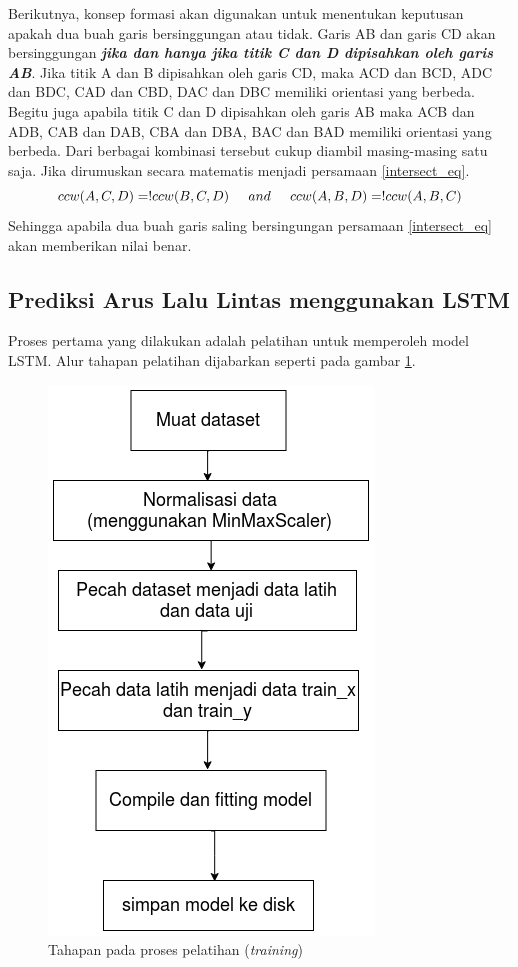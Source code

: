 \documentclass[conference]{IEEEtran}
\begin{document}
Berikutnya, konsep formasi akan digunakan untuk menentukan keputusan apakah dua buah garis bersinggungan atau tidak. Garis AB dan garis CD akan bersinggungan \textbf{\textit{jika dan hanya jika titik C dan D dipisahkan oleh garis AB}}.
Jika titik A dan B dipisahkan oleh garis CD, maka ACD dan BCD, ADC dan BDC, CAD dan CBD, DAC dan DBC memiliki orientasi yang berbeda. Begitu juga apabila titik C dan D dipisahkan oleh garis AB maka ACB dan ADB, CAB dan DAB, CBA dan DBA, BAC dan BAD memiliki orientasi yang berbeda. Dari berbagai kombinasi tersebut cukup diambil masing-masing satu saja.
Jika dirumuskan secara matematis menjadi persamaan \ref{intersect_eq}.
\begin{equation} \label{intersect_eq}
	ccw(A,C,D) =! ccw(B,C,D) \hspace{5mm} and \hspace{5mm} ccw(A,B,D) =! ccw(A,B,C)
\end{equation}
Sehingga apabila dua buah garis saling bersingungan persamaan \ref{intersect_eq} akan memberikan nilai benar.

\subsection{Prediksi Arus Lalu Lintas menggunakan LSTM}
Proses pertama yang dilakukan adalah pelatihan untuk memperoleh model LSTM. Alur tahapan pelatihan dijabarkan seperti pada gambar \ref{lstm_training}.
\begin{figure}
	\centering
	\includegraphics[scale=0.5]{Training_lstm}
	\caption{Tahapan pada proses pelatihan (\textit{training})}
	\label{lstm_training}
\end{figure}
\end{document}
